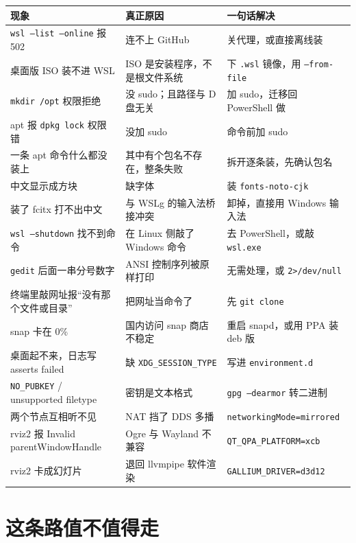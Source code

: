\documentclass[12pt,a4paper]{ctexbook}
\begin{document}
\begin{center}
\small
\begin{tabular}{|p{4.2cm}|p{4.4cm}|p{5.6cm}|}
\hline
\textbf{现象} & \textbf{真正原因} & \textbf{一句话解决} \\
\hline
\texttt{wsl --list --online} 报 502 & 连不上 GitHub & 关代理，或直接离线装 \\
桌面版 ISO 装不进 WSL & ISO 是安装程序，不是根文件系统 & 下 \texttt{.wsl} 镜像，用 \texttt{--from-file} \\
\texttt{mkdir /opt} 权限拒绝 & 没 sudo；且路径与 D 盘无关 & 加 sudo，迁移回 PowerShell 做 \\
apt 报 \texttt{dpkg lock} 权限错 & 没加 sudo & 命令前加 sudo \\
一条 apt 命令什么都没装上 & 其中有个包名不存在，整条失败 & 拆开逐条装，先确认包名 \\
中文显示成方块 & 缺字体 & 装 \texttt{fonts-noto-cjk} \\
装了 fcitx 打不出中文 & 与 WSLg 的输入法桥接冲突 & 卸掉，直接用 Windows 输入法 \\
\texttt{wsl --shutdown} 找不到命令 & 在 Linux 侧敲了 Windows 命令 & 去 PowerShell，或敲 \texttt{wsl.exe} \\
\texttt{gedit} 后面一串分号数字 & ANSI 控制序列被原样打印 & 无需处理，或 \texttt{2>/dev/null} \\
终端里敲网址报``没有那个文件或目录'' & 把网址当命令了 & 先 \texttt{git clone} \\
snap 卡在 0\% & 国内访问 snap 商店不稳定 & 重启 snapd，或用 PPA 装 deb 版 \\
桌面起不来，日志写 asserts failed & 缺 \texttt{XDG\_SESSION\_TYPE} & 写进 \texttt{environment.d} \\
\texttt{NO\_PUBKEY} / unsupported filetype & 密钥是文本格式 & \texttt{gpg --dearmor} 转二进制 \\
两个节点互相听不见 & NAT 挡了 DDS 多播 & \texttt{networkingMode=mirrored} \\
rviz2 报 Invalid parentWindowHandle & Ogre 与 Wayland 不兼容 & \texttt{QT\_QPA\_PLATFORM=xcb} \\
rviz2 卡成幻灯片 & 退回 llvmpipe 软件渲染 & \texttt{GALLIUM\_DRIVER=d3d12} \\
\hline
\end{tabular}
\end{center}

\section{这条路值不值得走}
\end{document}

